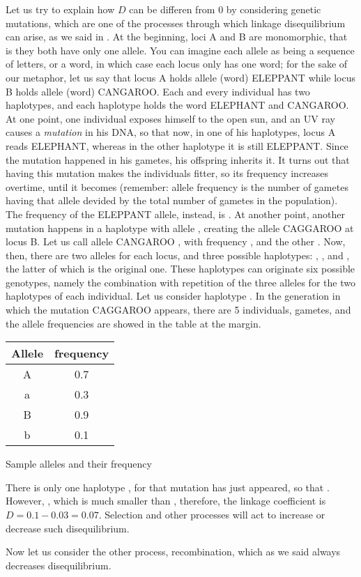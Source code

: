 \documentclass[../main.tex]{subfiles}
\begin{document}
Let us try to explain how \(D\) can be differen from \(0\) by 
considering genetic mutations, which are one of the processes through 
which linkage disequilibrium can arise, as we said in 
. At the beginning, loci A and B are monomorphic, 
that is they both have only one allele. You can imagine each allele as 
being a sequence of letters, or a word, in which case each locus only 
has one word; for the sake of our metaphor, let us say that locus A 
holds allele (word) ELEPPANT while locus B holds allele (word) CANGAROO. 
Each and every individual has two haplotypes, and each haplotype holds 
the word ELEPHANT and CANGAROO. At one point, one individual exposes 
himself to the open sun, and an UV ray causes a \textit{mutation} in his 
DNA, so that now, in one of his haplotypes, locus A reads ELEPHANT, 
whereas in the other haplotype it is still ELEPPANT. Since the mutation 
happened in his gametes, his offspring inherits it. It turns out that 
having this mutation makes the individuals fitter, so its frequency 
increases overtime, until it becomes  (remember: allele 
frequency is the number of gametes having that allele devided by the 
total number of gametes in the population). The frequency of the 
ELEPPANT allele, instead, is . At another point, another 
mutation happens in a haplotype with allele , creating the 
allele CAGGAROO at locus B. Let us call allele CANGAROO , with 
frequency , and the other . Now, then, there are two 
alleles for each locus, and three possible haplotypes: , 
, and , the latter of which is the original one. These 
haplotypes can originate six possible genotypes, namely the combination 
with repetition of the three alleles for the two haplotypes of each 
individual. Let us consider haplotype . In the generation in 
which the mutation CAGGAROO appears, there are 5 individuals,  
gametes, and the allele frequencies are showed in the table at the 
margin.

\begin{margintable}
\begin{tabular}{|c|c|}
	\hline
	Allele	& frequency	\\
	\hline
	A		& 0.7		\\
	a		& 0.3		\\
	B		& 0.9		\\
	b		& 0.1		\\
	\hline
\end{tabular}
\caption{Sample alleles and their frequency}
\end{margintable}

There is only one haplotype , for that mutation has just 
appeared, so that . However, , which is much smaller than , therefore, the 
  linkage coefficient is \(D = 0.1 - 0.03 = 0.07\). Selection and other 
  processes will act to increase or decrease such disequilibrium.

Now let us consider the other process, recombination, which as we said 
always decreases disequilibrium.
\end{document}
